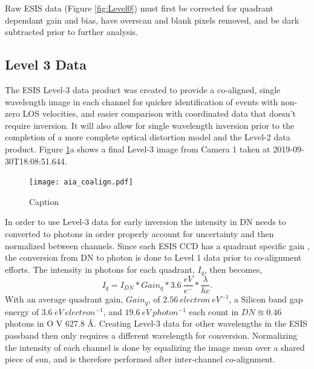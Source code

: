        Raw ESIS data (Figure \ref{fig:Level0}) must first be corrected for quadrant dependant gain and bias, have overscan and blank pixels removed, and be dark subtracted prior to further analysis.
       


    \subsection{Level 3 Data}
 
    
    	\newcommand{\vigfit}{[0.44, 0.34, 0.38, 0.5]}
    	\newcommand{\levthreetime}{2019-09-30T18:08:51.644}
    	
    	
    	The ESIS Level-3 data product was created to provide a co-aligned, single wavelength image in each channel for quicker identification of events with non-zero LOS velocities, and easier comparison with coordinated data that doesn't require inversion. 
    	It will also allow for single wavelength inversion prior to the completion of a more complete optical distortion model and the Level-2 data product.
    	Figure \ref{fig:coalign}a shows a final Level-3 image from Camera 1 taken at \levthreetime.
    	
  		\begin{figure}[htb!]
    		\centering
    		\texttt{[image: aia\_coalign.pdf]}
    		\caption{Caption}
    		\label{fig:coalign}
    	\end{figure}
    	
    
     	In order to use Level-3 data for early inversion the intensity in DN needs to  converted to photons in order properly account for uncertainty and then normalized between channels.
   		Since each ESIS CCD has a quadrant specific gain \citep{ESIS}, the conversion from DN to photon is done to Level 1 data prior to co-alignment efforts.
   		The intensity in photons for each quadrant, $I_q$, then becomes,
   		\begin{equation}
	   		I_q = I_{DN} * Gain_q * 3.6\ \frac{eV}{e^{-}} * \frac{\lambda}{hc}.
   		\end{equation}
   		With an average quadrant gain, $Gain_q$, of $2.56\ electron\ eV^{-1}$, a Silicon band gap energy of $3.6\ eV\ electron^{-1}$, and $19.6\ eV\ photon^{-1}$ each count in $DN \approxeq 0.46$ photons in O V 627.8 \AA .
   		Creating Level-3 data for other wavelengths in the ESIS passband then only requires a different wavelength for conversion.
   		Normalizing the intensity of each channel is done by equalizing the image mean over a shared piece of sun, and is therefore performed after inter-channel co-alignment.
   		
